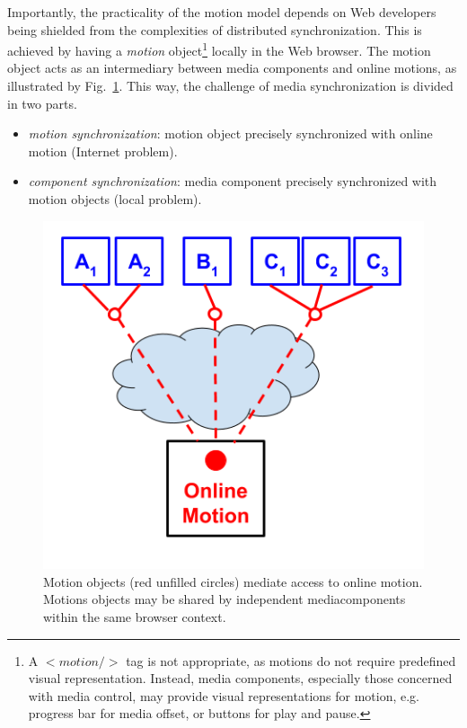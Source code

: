 Importantly, the practicality of the motion model depends on Web developers
being shielded from the complexities of distributed synchronization. This is
achieved by having a \emph{motion} object\footnote{ A $<motion/>$ tag is not
appropriate, as motions do not require predefined visual representation.
Instead, media components, especially those concerned with media control, may
provide visual representations for motion, e.g. progress bar for media offset,
or buttons for play and pause. } locally in the Web browser. The motion object
acts as an intermediary between media components and online motions, as
illustrated by Fig.~\ref{fig:model-2}. This way, the challenge of media synchronization
is divided in two parts.

\begin{itemize}
\item{\emph{motion synchronization}: motion object precisely synchronized with online motion (Internet problem).}
\item{\emph{component synchronization}: media component precisely synchronized with motion objects (local problem).} 
\end{itemize}


\begin{figure}[h]
\centering
\includegraphics[scale=.4]{fig/motion-model-2.png}
\caption{Motion objects (red unfilled circles) mediate access to online motion. Motions objects may be shared by independent mediacomponents within the same browser context.}
\label{fig:model-2}
\end{figure}

